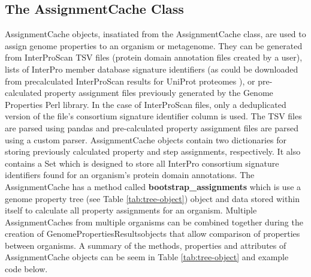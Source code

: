 \subsection{The AssignmentCache Class}

AssignmentCache objects, insatiated from the AssignmentCache class, are used to assign genome properties to an organism or metagenome. They can be generated from InterProScan TSV files (protein domain annotation files created by a user), lists of InterPro member database signature identifiers (as could be downloaded from precalculated InterProScan results for UniProt proteomes \cite{uniprot2014uniprot}), or pre-calculated property assignment files previously generated by the Genome Properties Perl library. In the case of InterProScan files, only a deduplicated version of the file's consortium signature identifier column is used. The TSV files are parsed using pandas and pre-calculated property assignment files are parsed using a custom parser. AssignmentCache objects contain two dictionaries for storing previously calculated property and step assignments, respectively. It also contains a Set which is designed to store all InterPro consortium signature identifiers found for an organism's protein domain annotations. The AssignmentCache has a method called \textbf{bootstrap\_assignments} which is use a genome property tree (see Table \ref{tab:tree-object}) object and data stored within itself to calculate all property assignments for an organism. Multiple AssignmentCaches from multiple organisms can be combined together during the creation of GenomePropertiesResultsobjects that allow comparison of properties between organisms. A summary of the methods, properties and attributes of AssignmentCache objects can be seem in Table \ref{tab:tree-object} and example code below.

